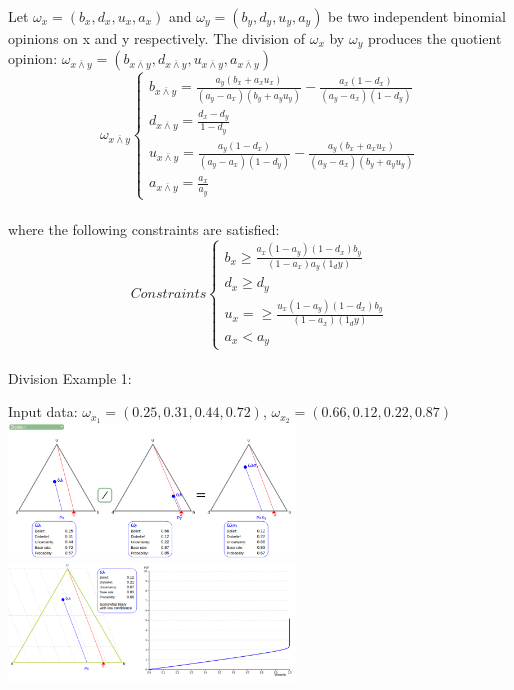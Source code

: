 \documentclass[UTF8]{article}
\newcommand{\opinion}[5]{$\omega_{#1} = (#2, #3, #4, #5)$}
\begin{document}
Let \opinion{x}{b_x}{d_x}{u_x}{a_x} and \opinion{y}{b_y}{d_y}{u_y}{a_y} be two independent binomial opinions on x and y respectively.
The division of $\omega_x$ by $\omega_y$ produces the quotient opinion: \opinion{x \overline{\land} y}{b_{x \overline{\land} y}}{d_{x \overline{\land} y}}{u_{x \overline{\land} y}}{a_{x \overline{\land} y}}
$$
\omega_{x \overline{\land} y}
\begin{cases}
    b_{x \overline{\land} y} = \frac{a_y(b_x + a_xu_x)}{(a_y - a_x)(b_y + a_yu_y)} - \frac{a_x (1 - d_x)}{(a_y - a_x)(1 - d_y)}\\
    d_{x \overline{\land} y} = \frac{d_x - d_y}{1 - d_y}\\
    u_{x \overline{\land} y} = \frac{a_y (1 - d_x)}{(a_y - a_x)(1 - d_y)} - \frac{a_y(b_x + a_xu_x)}{(a_y - a_x)(b_y + a_yu_y)}\\
    a_{x \overline{\land} y} = \frac{a_x}{a_y}
\end{cases}
$$\\
where the following constraints are satisfied:
$$
Constraints
\begin{cases}
    b_x \geq \frac{a_x(1 - a_y) (1 - d_x) b_y}{(1 - a_x)a_y (1_dy)}\\
    d_x \geq d_y\\
    u_x = \geq \frac{u_x(1 - a_y) (1 - d_x) b_y}{(1 - a_x) (1_dy)}\\
    a_x < a_y
\end{cases}
$$\\
Division Example 1:\\
\begin{center}
    Input data:
    \opinion{x_1}{0.25}{0.31}{0.44}{0.72}, 
    \opinion{x_2}{0.66}{0.12}{0.22}{0.87}\\
    \includegraphics[width=3in]{images/div1.png}
    \includegraphics[width=3in]{images/div1viz.png}
\end{center}
\end{document}
